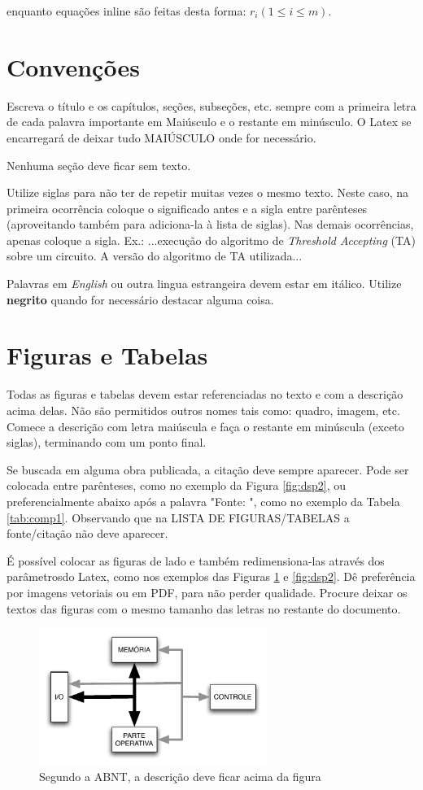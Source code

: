 enquanto equações inline são feitas desta forma: $r_i (1\leq i \leq m)$.

\section{Convenções}
Escreva o título e os capítulos, seções, subseções, etc. sempre com a primeira letra de cada palavra importante em Maiúsculo e o restante em minúsculo. O Latex se encarregará de deixar tudo MAIÚSCULO onde for necessário.

Nenhuma seção deve ficar sem texto.

Utilize siglas para não ter de repetir muitas vezes o mesmo texto. Neste caso, na primeira ocorrência coloque o significado antes e a sigla entre parênteses (aproveitando também para adiciona-la à lista de siglas). Nas demais ocorrências, apenas coloque a sigla. 
Ex.: ...execução do algoritmo de  \textit{Threshold Accepting} (TA) sobre um circuito. A versão do algoritmo de TA utilizada...

Palavras em \textit{English} ou outra lingua estrangeira devem estar em itálico. Utilize \textbf{negrito} quando for necessário destacar alguma coisa.

\section{Figuras e Tabelas}

Todas as figuras e tabelas devem estar referenciadas no texto e com a descrição acima delas. Não são permitidos outros nomes tais como: quadro, imagem, etc.  Comece a descrição com letra maiúscula e faça o restante em minúscula (exceto siglas), terminando com um ponto final.

Se buscada em alguma obra publicada, a citação deve sempre aparecer. Pode ser colocada entre parênteses, como no exemplo da Figura \ref{fig:dsp2}, ou preferencialmente abaixo após a palavra "Fonte: ", como no exemplo da Tabela \ref{tab:comp1}. Observando que na LISTA DE FIGURAS/TABELAS a fonte/citação não deve aparecer.

É possível colocar as figuras de lado e também redimensiona-las através dos parâmetrosdo Latex, como nos exemplos das Figuras \ref{fig:dsp} e \ref{fig:dsp2}. Dê preferência por imagens vetoriais ou em PDF, para não perder qualidade. Procure deixar os textos das figuras com o mesmo tamanho das letras no restante do documento.

\begin{figure} %
    \caption{Segundo a ABNT, a descrição deve ficar acima da figura}
    \centerline{\includegraphics[width=20em]{figuras/dsp}}
    \label{fig:dsp}
\end{figure}

